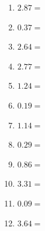 \documentclass[12pt]{article}
\begin{document}
\begin{enumerate}
\item \large $ 2.87 = $ \vspace{1.5cm}
\item \large $ 0.37 = $ \vspace{1.5cm}
\newpage
\item \large $ 2.64 = $ \vspace{1.5cm}
\item \large $ 2.77 = $ \vspace{1.5cm}
\item \large $ 1.24 = $ \vspace{1.5cm}
\item \large $ 0.19 = $ \vspace{1.5cm}
\item \large $ 1.14 = $ \vspace{1.5cm}
\item \large $ 0.29 = $ \vspace{1.5cm}
\item \large $ 0.86 = $ \vspace{1.5cm}
\item \large $ 3.31 = $ \vspace{1.5cm}
\item \large $ 0.09 = $ \vspace{1.5cm}
\item \large $ 3.64 = $ \vspace{1.5cm}
\end{enumerate}\newpage
\end{document}
